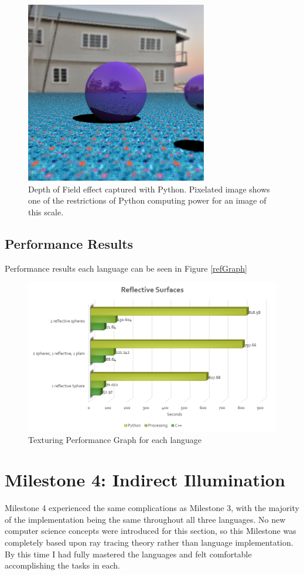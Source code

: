 \begin{figure}[ht]
\centering
\includegraphics[width=300px]{figures/python-distributed.png}
\caption{Depth of Field effect captured with Python.  Pixelated image shows one of the restrictions of Python computing power for an image of this scale.}
\label{fig:pyDist}
\end{figure}

\subsection{Performance Results}
Performance results each language can be seen in Figure \ref{refGraph}
\begin{figure}[ht]
\centering
\includegraphics[width=\textwidth]{figures/graphs/reflective-graph.png}
\caption{Texturing Performance Graph for each language}
\label{fig:refGraph}
\end{figure}

\section{Milestone 4: Indirect Illumination}
Milestone 4 experienced the same complications as Milestone 3, with the majority of the implementation being the same throughout all three languages.  No new computer science concepts were introduced for this section, so this Milestone was completely based upon ray tracing theory rather than language implementation.  By this time I had fully mastered the languages and felt comfortable accomplishing the tasks in each.
